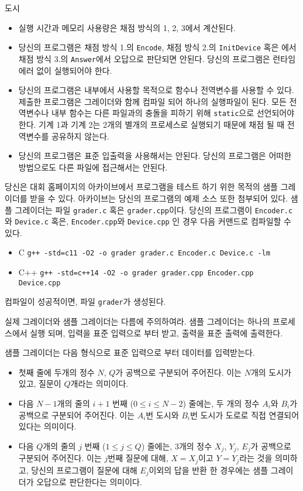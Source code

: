 \begin{problem}{도시}
	\Notes
	
	\begin{itemize}
		\item 실행 시간과 메모리 사용량은 채점 방식의 1, 2, 3에서 계산된다.
		\item 당신의 프로그램은 채점 방식 1.의 \texttt{Encode}, 채점 방식 2.의 \texttt{InitDevice} 혹은 에서 채점 방식 3.의 \texttt{Answer}에서 오답으로 판단되면 안된다. 당신의 프로그램은 런타임 에러 없이 실행되어야 한다.
		\item 당신의 프로그램은 내부에서 사용할 목적으로 함수나 전역변수를 사용할 수 있다. 제출한 프로그램은 그레이더와 함께 컴파일 되어 하나의 실행파일이 된다. 모든 전역변수나 내부 함수는 다른 파일과의 충돌을 피하기 위해 \texttt{static}으로 선언되어야 한다. 기계 1과 기계 2는 2개의 별개의 프로세스로 실행되기 때문에 채점 될 때 전역변수를 공유하지 않는다.
		\item 당신의 프로그램은 표준 입출력을 사용해서는 안된다. 당신의 프로그램은 어떠한 방법으로도 다른 파일에 접근해서는 안된다. 
	\end{itemize}
	
	당신은 대회 홈페이지의 아카이브에서 프로그램을 테스트 하기 위한 목적의 샘플 그레이더를 받을 수 있다. 아카이브는 당신의 프로그램의 예제 소스 또한 첨부되어 있다.
	샘플 그레이더는 파일 \texttt{grader.c} 혹은 \texttt{grader.cpp}이다. 당신의 프로그램이 \texttt{Encoder.c}와 \texttt{Device.c} 혹은, \texttt{Encoder.cpp}와 \texttt{Device.cpp} 인 경우 다음 커맨드로 컴파일할 수 있다.
	
	\begin{itemize}
		\item C
		\texttt{g++ -std=c11 -O2 -o grader grader.c Encoder.c Device.c -lm}
		\item C++
		\texttt{g++ -std=c++14 -O2 -o grader grader.cpp Encoder.cpp Device.cpp }
	\end{itemize}
	
	컴파일이 성공적이면, 파일 \texttt{grader}가 생성된다.
	
	실제 그레이더와 샘플 그레이더는 다름에 주의하여라. 샘플 그레이더는 하나의 프로세스에서 실행 되며, 입력을 표준 입력으로 부터 받고, 출력을 표준 출력에 출력한다.
	
	\InputFile
	
	샘플 그레이더는 다음 형식으로 표준 입력으로 부터 데이터를 입력받는다.
	
	\begin{itemize}
		\item 첫째 줄에 두개의 정수 $N$, $Q$가 공백으로 구분되어 주어진다. 이는 $N$개의 도시가 있고, 질문이 $Q$개라는 의미이다.
		\item 다음 $N-1$개의 줄의 $i+1$ 번째 ($0 \le i \le N-2$) 줄에는, 두 개의 정수 $A_i$와 $B_i$가 공백으로 구분되어 주어진다. 이는 $A_i$번 도시와 $B_i$번 도시가 도로로 직접 연결되어 있다는 의미이다.
		\item 다음 $Q$개의 줄의 $j$ 번째 ($1 \le j \le Q$) 줄에는, 3개의 정수 $X_j$, $Y_j$, $E_j$가 공백으로 구분되어 주어진다. 이는 $j$번째 질문에 대해, $X=X_j$이고 $Y=Y_j$라는 것을 의미하고, 당신의 프로그램이 질문에 대해 $E_j$이외의 답을 반환 한 경우에는 샘플 그레이더가 오답으로 판단한다는 의미이다.
	\end{itemize}
	

\end{problem}
